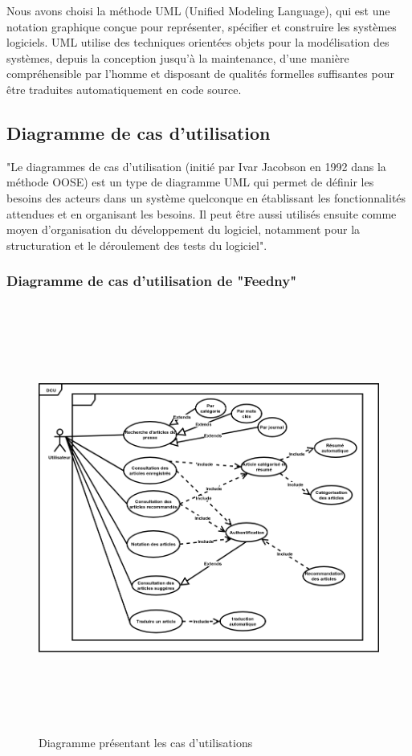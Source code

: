 Nous avons choisi la méthode UML (Unified Modeling Language), qui est une notation graphique conçue pour représenter, spécifier et construire les systèmes logiciels. UML utilise des techniques orientées objets pour la modélisation des systèmes, depuis la conception jusqu'à la maintenance, d'une manière compréhensible par l'homme et disposant de qualités formelles suffisantes pour être traduites automatiquement en code source.\cite{UML}

\subsection{Diagramme de cas d'utilisation}
"Le diagrammes de cas d'utilisation (initié par Ivar Jacobson en 1992 dans la méthode OOSE) est un type de diagramme UML qui permet de définir les besoins des acteurs dans un système quelconque en établissant les fonctionnalités attendues et en organisant les besoins. Il peut être aussi utilisés ensuite comme moyen d'organisation du développement du logiciel, notamment pour la structuration et le déroulement des tests du logiciel".\cite{UML}

\subsubsection{Diagramme de cas d'utilisation de "Feedny"}
\begin{figure}[H]
    \centering
    \includegraphics[height=400pt,width=350pt]{img/chapter3/diagcasdutilisation.png}
    \caption{Diagramme présentant les cas d'utilisations}
\end{figure}

